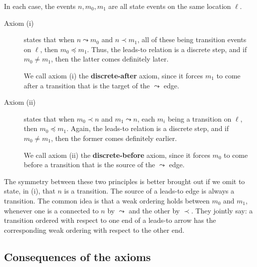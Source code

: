 In each case, the events $n,m_0,m_1$ are all state events on the same
location $\ell$.
%
\begin{description}
  \item[Axiom (i)] states that when $n\leadsto m_0$ and $n\prec m_1$,
  all of these being transition events on $\ell$, then
  $m_0\preceq m_1$.  Thus, the leads-to relation is a discrete step,
  and if $m_0\not= m_1$, then the latter comes definitely later.

  We call axiom (i) the \textbf{discrete-after} axiom, since it forces
  $m_1$ to come after a transition that is the target of the
  $\leadsto$ edge.
  \item[Axiom (ii)] states that when $m_0\prec n$ and $m_1\leadsto n$,
  each $m_i$ being a transition on $\ell$, then $m_0\preceq m_1$.
  Again, the leads-to relation is a discrete step, and if
  $m_0\not= m_1$, then the former comes definitely earlier.

  We call axiom (ii) the \textbf{discrete-before} axiom, since it
  forces $m_0$ to come before a transition that is the source of the
  $\leadsto$ edge.
\end{description}
%
The symmetry between these two principles is better brought out if we
omit to state, in (i), that $n$ is a transition.  The source of a
leads-to edge is always a transition.  The common idea is that a weak
ordering holds between $m_0$ and $m_1$, whenever one is a connected to
$n$ by $\leadsto$ and the other by $\prec$.  They jointly say:  a
transition ordered with respect to one end of a leads-to arrow has the
corresponding weak ordering with respect to the other end.


\subsection{Consequences of the axioms}
\label{sec:channels:state:consequences}

